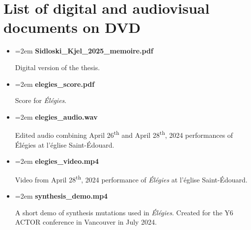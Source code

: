 \documentclass[12pt,twoside,maitrise]{dms_ks}
\theoremstyle{definition}
\begin{document}
{%

\chapter*{List of digital and audiovisual documents on DVD}


\begin{itemize}
    \setlength\itemsep{0.5em}  %
    \setlength\parskip{0pt}    %
    \setlength\parsep{0pt}
    \setlength\leftskip{0pt}   %
    \setlength{\labelsep}{0pt} %
    \renewcommand{\labelitemi}{} %
    \renewcommand{\labelitemii}{} %
    \raggedright

    \item \hangindent=2em \textbf{Sidloski\_Kjel\_2025\_memoire.pdf}
    \par Digital version of the thesis.
     
    \item \hangindent=2em \textbf{elegies\_score.pdf}
    \par Score for \textit{Élégies}.
    
    \item \hangindent=2em \textbf{elegies\_audio.wav}
    \par Edited audio combining April 26\textsuperscript{th} and April 28\textsuperscript{th}, 2024 performances of Élégies at l'église Saint-Édouard.
    
    \item \hangindent=2em \textbf{elegies\_video.mp4}
    \par Video from April 28\textsuperscript{th}, 2024 performance of \textit{Élégies} at l'église Saint-Édouard.
    
    \item \hangindent=2em \textbf{synthesis\_demo.mp4}
    \par A short demo of synthesis mutations used in \textit{Élégies}. Created for the Y6 ACTOR conference in Vancouver in July 2024.
    

\end{itemize}}
\end{document}
